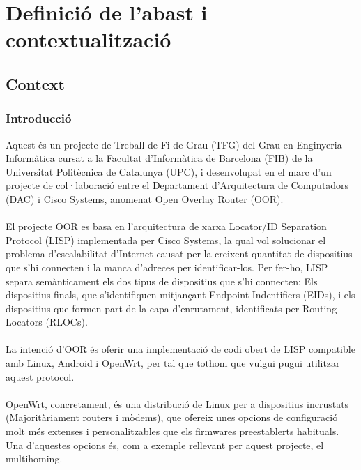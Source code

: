 \documentclass[11pt]{article}
\begin{document}
\newpage
\renewcommand{\thepage}{\roman{page}}
\setcounter{page}{1}
\tableofcontents
\lstlistoflistings
\listoffigures
\newpage
\renewcommand{\thepage}{\arabic{page}}
\setcounter{page}{1}					%
\section{Definició de l'abast i contextualització}
\subsection{Context}
\subsubsection{Introducció}
Aquest és un projecte de Treball de Fi de Grau (TFG) del Grau en Enginyeria Informàtica cursat a la Facultat d’Informàtica de Barcelona (FIB) de la Universitat Politècnica de Catalunya (UPC), i desenvolupat en el marc d’un projecte de col·laboració entre el Departament d’Arquitectura de Computadors (DAC) i Cisco Systems, anomenat Open Overlay Router (OOR).\\
\\
El projecte OOR es basa en l’arquitectura de xarxa Locator/ID Separation Protocol (LISP\cite{dino13}) implementada per Cisco Systems, la qual vol solucionar el problema d’escalabilitat d’Internet causat per la creixent quantitat de dispositius que s’hi connecten i la manca d’adreces per identificar-los. Per fer-ho, LISP separa semànticament els dos tipus de dispositius que s’hi connecten: Els dispositius finals, que s’identifiquen mitjançant Endpoint Indentifiers (EIDs), i els dispositius que formen part de la capa d’enrutament, identificats per Routing Locators (RLOCs).\\
\\
La intenció d’OOR és oferir una implementació de codi obert de LISP compatible amb Linux, Android i OpenWrt, per tal que tothom que vulgui pugui utilitzar aquest protocol.\\
\\
OpenWrt, concretament, és una distribució de Linux per a dispositius incrustats (Majoritàriament routers i mòdems), que ofereix unes opcions de configuració molt més extenses i personalitzables que els firmwares preestablerts habituals\cite{open16}. Una d’aquestes opcions és, com a exemple rellevant per aquest projecte, el multihoming.\\
\\
\end{document}
